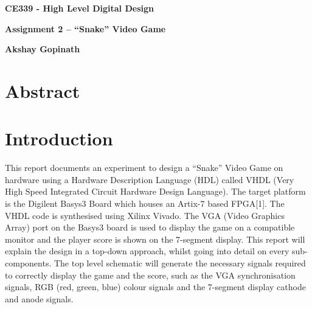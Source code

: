 \documentclass[aps, secnumarabic, balancelastpage, asmath, amssymb, nofootinbib, floatfix,]{revtex4-2}
\begin{document}

\thispagestyle{plain}
\begin{center}
    \Large
    \textbf{CE339 - High Level Digital Design}
        
    \vspace{0.4cm}
    \large
    \textbf{Assignment 2 -- ``Snake'' Video Game}
        
    \vspace{0.4cm}
    \textbf{Akshay Gopinath}
       
    \section*{Abstract}
    \fontsize{11pt}{12pt}\selectfont
    
\end{center}
\fontsize{11pt}{12pt}\selectfont
{
\setlength{\parindent}{0pt}


}
\clearpage

\tableofcontents

\clearpage

\listoffigures
\clearpage

\listoftables

\clearpage


\section{\fontsize{11.3pt}{12pt}\selectfont \bf Introduction}
\fontsize{11pt}{12pt}\selectfont
\label{sec:1}

{
\setlength{\parindent}{0pt}

This report documents an experiment to design a ``Snake'' Video Game on hardware using a Hardware Description Language (HDL) called VHDL (Very High Speed Integrated Circuit Hardware Design Language). The target platform is the Digilent Basys3 Board which houses an Artix-7 based FPGA[1]. The VHDL code is synthesised using Xilinx Vivado. The VGA (Video Graphics Array) port on the Basys3 board is used to display the game on a compatible monitor and the player score is shown on the 7-segment display. This report will explain the design in a top-down approach, whilst going into detail on every sub-components. The top level schematic will generate the necessary signals required to correctly display the game and the score, such as the VGA synchronisation signals, RGB (red, green, blue) colour signals and the 7-segment display cathode and anode signals.


}
\end{document}

